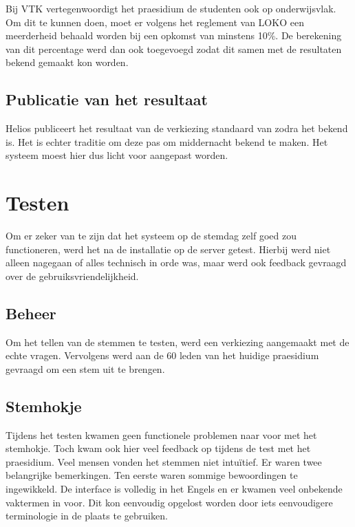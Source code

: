 Bij VTK vertegenwoordigt het praesidium de studenten ook op onderwijsvlak. Om dit te kunnen doen, moet er volgens het reglement van LOKO een meerderheid behaald worden bij een opkomst van minstens 10\%.\cite{loko_kiesreglement_verkiezingen} De berekening van dit percentage werd dan ook toegevoegd zodat dit samen met de resultaten bekend gemaakt kon worden.

\subsection{Publicatie van het resultaat}

Helios publiceert het resultaat van de verkiezing standaard van zodra het bekend is. Het is echter traditie om deze pas om middernacht bekend te maken. Het systeem moest hier dus licht voor aangepast worden.

\section{Testen}
\label{sec:kv:testen}

Om er zeker van te zijn dat het systeem op de stemdag zelf goed zou functioneren, werd het na de installatie op de server getest. Hierbij werd niet alleen nagegaan of alles technisch in orde was, maar werd ook feedback gevraagd over de gebruiksvriendelijkheid. 

\subsection{Beheer}
\label{sec:kv:beheer}


\npar Om het tellen van de stemmen te testen, werd een verkiezing aangemaakt met de echte vragen. Vervolgens werd aan de 60 leden van het huidige praesidium gevraagd om een stem uit te brengen.

\subsection{Stemhokje}
\label{sec:kv:stemhokje}

Tijdens het testen kwamen geen functionele problemen naar voor met het stemhokje. Toch kwam ook hier veel feedback op tijdens de test met het praesidium. Veel mensen vonden het stemmen niet intu\"itief. Er waren twee belangrijke bemerkingen. Ten eerste waren sommige bewoordingen te ingewikkeld. De interface is volledig in het Engels en er kwamen veel onbekende vaktermen in voor. Dit kon eenvoudig opgelost worden door iets eenvoudigere terminologie in de plaats te gebruiken.


